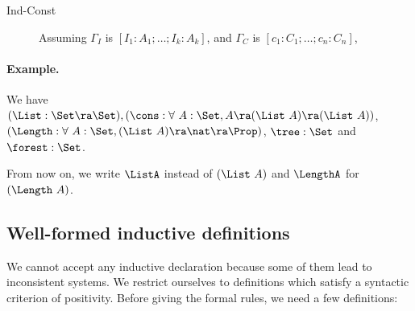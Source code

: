 \begin{description}
\item[Ind-Const] Assuming 
  $\Gamma_I$ is $[I_1:A_1;\ldots;I_k:A_k]$, and $\Gamma_C$ is
  $[c_1:C_1;\ldots;c_n:C_n]$,
   

\end{description}

\paragraph{Example.}
We have $(\List:\Set \ra \Set), (\cons:\forall~A:\Set,A\ra(\List~A)\ra
(\List~A))$, \\ 
$(\Length:\forall~A:\Set, (\List~A)\ra\nat\ra\Prop)$, $\tree:\Set$ and $\forest:\Set$.

From now on, we write $\ListA$ instead of $(\List~A)$ and $\LengthA$
for $(\Length~A)$.



\subsection{Well-formed inductive definitions}
We cannot accept any inductive declaration because some of them lead
to inconsistent systems. We restrict ourselves to definitions which
satisfy a syntactic criterion of positivity. Before giving the formal
rules, we need a few definitions:

